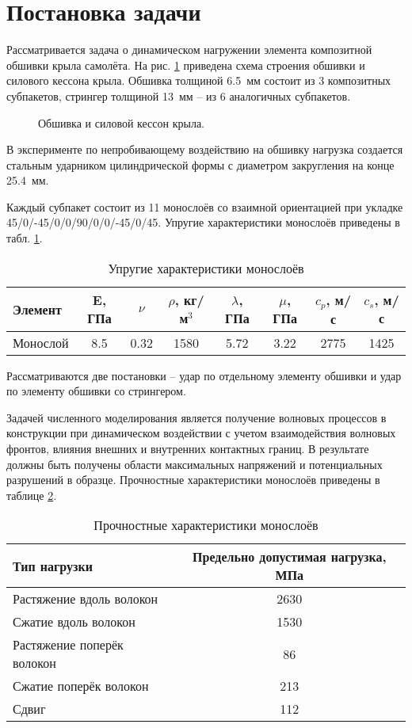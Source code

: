 \section{Постановка задачи}

Рассматривается задача о динамическом нагружении элемента композитной обшивки крыла самолёта. На рис.
\ref{pic:construction_intro} приведена схема строения обшивки и силового кессона крыла. Обшивка толщиной 6.5~мм состоит из 3 композитных субпакетов, стрингер толщиной 13~мм -- из 6 аналогичных субпакетов.

\begin{figure}[h]
\caption{Обшивка и силовой кессон крыла.}
\label{pic:construction_intro}
\end{figure}

В эксперименте по непробивающему воздействию на обшивку нагрузка создается стальным 
ударником цилиндрической формы с диаметром закругления на конце 25.4~мм.

Каждый субпакет состоит из 11 монослоёв со взаимной ориентацией при укладке 
45/0/-45/0/0/90/0/0/-45/0/45. Упругие характеристики монослоёв приведены в табл. \ref{tbl:subpackage_intro}.

\begin{table}[h]
\centering
\caption{Упругие характеристики монослоёв}
\begin{tabular}{|p{3cm}|c|c|c|c|c|c|c|}
\hline
Элемент & E, ГПа & $\nu$ & $\rho$, кг/м$^{3}$ & $\lambda$, ГПа & $\mu$, ГПа &
$c_p$, м/с & $c_s$, м/с \\
\hline
Монослой & 8.5 & 0.32 & 1580 & 5.72 & 3.22 & 2775 & 1425 \\
\hline
\end{tabular}
\label{tbl:subpackage_intro}
\end{table}

Рассматриваются две постановки -- удар по отдельному элементу обшивки и удар по элементу обшивки со стрингером.

Задачей численного моделирования является получение волновых процессов в конструкции при динамическом воздействии с учетом взаимодействия волновых фронтов, влияния внешних и внутренних контактных границ. В результате должны быть получены области максимальных напряжений и потенциальных разрушений в образце. Прочностные характеристики монослоёв приведены в таблице \ref{tbl:max_stresses_intro}.

\begin{table}[h]
\centering
\caption{Прочностные характеристики монослоёв}
\begin{tabular}{|l|c|}
\hline
Тип нагрузки & Предельно допустимая нагрузка, МПа \\
\hline
Растяжение вдоль волокон & 2630 \\
Сжатие вдоль волокон & 1530 \\
Растяжение поперёк волокон & 86 \\
Сжатие поперёк волокон & 213 \\
Сдвиг & 112 \\
\hline
\end{tabular}
\label{tbl:max_stresses_intro}
\end{table}


